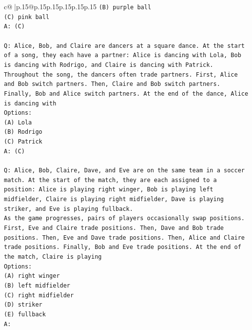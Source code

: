 \documentclass{article}
\begin{document}
{\begin{supertabular}{c@{$\;$}|p{.15\linewidth}@{}p{.15\linewidth}p{.15\linewidth}p{.15\linewidth}p{.15\linewidth}p{.15\linewidth}}
{{{\texttt{(B) purple ball} \\
\texttt{(C) pink ball} \\
\texttt{A: (C)} \\
\\ 
\texttt{Q: Alice, Bob, and Claire are dancers at a square dance. At the start of a song, they each have a partner: Alice is dancing with Lola, Bob is dancing with Rodrigo, and Claire is dancing with Patrick.} \\
\texttt{Throughout the song, the dancers often trade partners. First, Alice and Bob switch partners. Then, Claire and Bob switch partners. Finally, Bob and Alice switch partners. At the end of the dance, Alice is dancing with} \\
\texttt{Options:} \\
\texttt{(A) Lola} \\
\texttt{(B) Rodrigo} \\
\texttt{(C) Patrick} \\
\texttt{A: (C)} \\
\\ 
\texttt{Q: Alice, Bob, Claire, Dave, and Eve are on the same team in a soccer match. At the start of the match, they are each assigned to a position: Alice is playing right winger, Bob is playing left midfielder, Claire is playing right midfielder, Dave is playing striker, and Eve is playing fullback.} \\
\texttt{As the game progresses, pairs of players occasionally swap positions. First, Eve and Claire trade positions. Then, Dave and Bob trade positions. Then, Eve and Dave trade positions. Then, Alice and Claire trade positions. Finally, Bob and Eve trade positions. At the end of the match, Claire is playing} \\
\texttt{Options:} \\
\texttt{(A) right winger} \\
\texttt{(B) left midfielder} \\
\texttt{(C) right midfielder} \\
\texttt{(D) striker} \\
\texttt{(E) fullback} \\
\texttt{A:} \\
            }
        }
    }
     \\ \\


\end{supertabular}}
\end{document}
